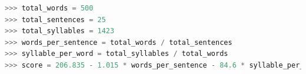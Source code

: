\documentclass{beamer}
\begin{document}
\begin{frame}[fragile]
\begin{lstlisting}[language=python]
>>> total_words = 500
>>> total_sentences = 25
>>> total_syllables = 1423
>>> words_per_sentence = total_words / total_sentences
>>> syllable_per_word = total_syllables / total_words
>>> score = 206.835 - 1.015 * words_per_sentence - 84.6 * syllable_per_word
\end{lstlisting}
\end{frame}
\end{document}
